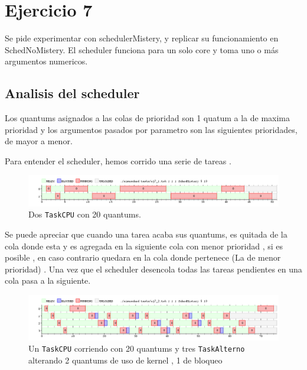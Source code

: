 \newpage
\section{Ejercicio 7}
	Se pide experimentar con schedulerMistery, y replicar su funcionamiento en SchedNoMistery. 
	El scheduler funciona para un solo core y toma uno o más argumentos numericos. 

	\subsection{Analisis del scheduler}

	Los quantums asignados a las colas de prioridad son 1 quatum a la de maxima prioridad y los argumentos pasados por parametro son las siguientes prioridades, de mayor a menor.

	Para entender el scheduler, hemos corrido  una serie de tareas .

	\begin{figure}[ht]
		\begin{center}
			\includegraphics[width=1\columnwidth]{imagenes/ej7_1.png}
			\caption{Dos \texttt{TaskCPU} con 20 quantums.}
		\end{center}
	\end{figure}

	Se puede apreciar que cuando una  tarea acaba sus quantums, es quitada de la cola donde esta y es  agregada en la siguiente cola con menor prioridad , si es posible , en caso contrario quedara en la cola donde pertenece (La de menor prioridad) . Una vez que el scheduler desencola todas las tareas pendientes en una cola pasa a la siguiente.


	\begin{figure}[ht]
		\begin{center}
			\includegraphics[width=1\columnwidth]{imagenes/ej7_2.png}
			\caption{Un \texttt{TaskCPU} corriendo con 20 quantums y tres \texttt{TaskAlterno} alterando 2 quantums de uso de kernel , 1 de bloqueo}
		\end{center}
	\end{figure}

